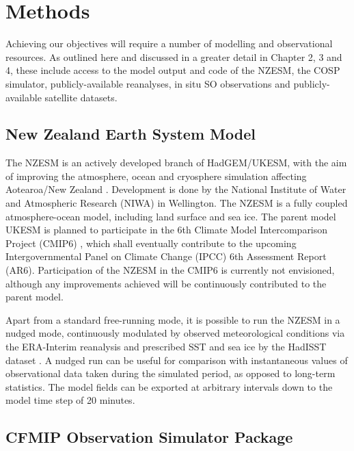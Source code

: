 \section{Methods}

Achieving our objectives will require a number of modelling and
observational resources. As outlined here and discussed in
a greater detail in Chapter 2, 3 and 4, these include access to the model output
and
code of the NZESM, the COSP simulator, publicly-available reanalyses,
 in situ SO observations and publicly-available
satellite datasets.

\subsection{New Zealand Earth System Model}

The NZESM is an actively developed branch of HadGEM/UKESM, with the
aim of improving the atmosphere, ocean and cryosphere simulation affecting
Aotearoa/New Zealand
\citep{williams2016}. Development is done by the National Institute of Water and
Atmospheric Research (NIWA) in Wellington.
The NZESM is a fully coupled atmosphere-ocean model, including land surface
and sea ice. The parent model UKESM \citep{walters2017} is planned to participate
in the 6th Climate Model Intercomparison Project (CMIP6) \citep{eyring2016,meehl2014},
which shall eventually contribute to the upcoming
Intergovernmental Panel on Climate Change (IPCC) 6th
Assessment Report (AR6). Participation of the NZESM in the CMIP6 is currently not
envisioned, although any improvements achieved will be continuously contributed
to the parent model.

Apart from a standard free-running mode, it is possible to run the NZESM
in a nudged mode, continuously modulated by observed meteorological
conditions via the ERA-Interim reanalysis \citep{dee2011} and prescribed SST and sea ice
by the HadISST dataset \citep{rayner2003}.
A nudged run can be useful for comparison with instantaneous values of
observational data taken during the simulated period,
as opposed to long-term statistics. The model fields can be exported
at arbitrary intervals down to the model time step of 20 minutes.

\subsection{CFMIP Observation Simulator Package}

